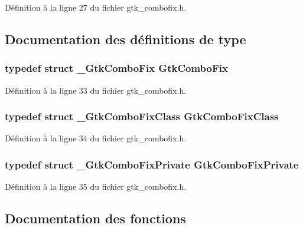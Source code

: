 Définition à la ligne 27 du fichier gtk\_\-combofix.h.



\subsection{Documentation des définitions de type}
\subsubsection[{GtkComboFix}]{\setlength{\rightskip}{0pt plus 5cm}typedef struct {\bf \_\-GtkComboFix} {\bf GtkComboFix}}\label{gtk__combofix_8h_a09befe2a81cba3dd605dc88cc1f0e8df}


Définition à la ligne 33 du fichier gtk\_\-combofix.h.

\subsubsection[{GtkComboFixClass}]{\setlength{\rightskip}{0pt plus 5cm}typedef struct {\bf \_\-GtkComboFixClass} {\bf GtkComboFixClass}}\label{gtk__combofix_8h_a531903b6564122292d7466f0bd437bf3}


Définition à la ligne 34 du fichier gtk\_\-combofix.h.

\subsubsection[{GtkComboFixPrivate}]{\setlength{\rightskip}{0pt plus 5cm}typedef struct {\bf \_\-GtkComboFixPrivate} {\bf GtkComboFixPrivate}}\label{gtk__combofix_8h_a68e48bd9b889f1163c898176b169000c}


Définition à la ligne 35 du fichier gtk\_\-combofix.h.



\subsection{Documentation des fonctions}
